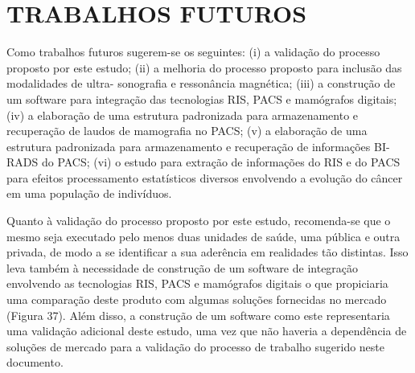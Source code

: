 \chapter[TRABALHOS FUTUROS]{\textbf{TRABALHOS FUTUROS}}
Como trabalhos futuros sugerem-se os seguintes: (i) a validação do processo proposto por
este estudo; (ii) a melhoria do processo proposto para inclusão das modalidades de ultra-
sonografia e ressonância magnética; (iii) a construção de um software para integração das
tecnologias RIS, PACS e mamógrafos digitais; (iv) a elaboração de uma estrutura
padronizada para armazenamento e recuperação de laudos de mamografia no PACS; (v) a
elaboração de uma estrutura padronizada para armazenamento e recuperação de
informações BI-RADS do PACS; (vi) o estudo para extração de informações do RIS e do
PACS para efeitos processamento estatísticos diversos envolvendo a evolução do câncer
em uma população de indivíduos.

Quanto à validação do processo proposto por este estudo, recomenda-se que o mesmo
seja executado pelo menos duas unidades de saúde, uma pública e outra privada, de modo
a se identificar a sua aderência em realidades tão distintas. Isso leva também à necessidade
de construção de um software de integração envolvendo as tecnologias RIS, PACS e
mamógrafos digitais o que propiciaria uma comparação deste produto com algumas
soluções fornecidas no mercado (Figura 37). Além disso, a construção de um software
como este representaria uma validação adicional deste estudo, uma vez que não haveria a
dependência de soluções de mercado para a validação do processo de trabalho sugerido
neste documento.